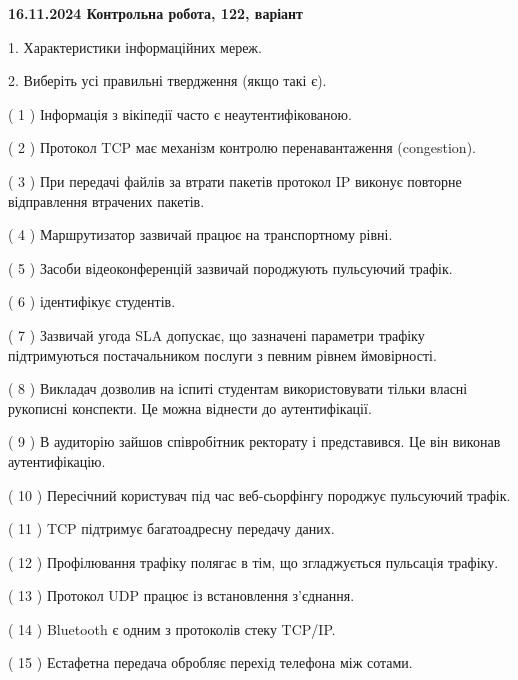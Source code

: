 \documentclass[12pt, ukrainian]{article}
\begin{document}
\vspace{4mm}
\newpage
\begin {large}

\textbf{16.11.2024 Контрольна робота, 122, варіант  }\par


{
1. Характеристики інформаційних мереж.



\vspace{5mm}
2. Виберіть усі правильні твердження (якщо такі є).\par
\vspace{2mm}

( 1 ) Інформація з вікіпедії часто є неаутентифікованою.

( 2 ) Протокол TCP має механізм контролю перенавантаження (congestion).

( 3 ) При передачі файлів за втрати пакетів протокол IP виконує повторне відправлення втрачених пакетів.

( 4 ) Маршрутизатор зазвичай працює на транспортному рівні.

( 5 ) Засоби відеоконференцій зазвичай породжують пульсуючий трафік.

( 6 ) ідентифікує студентів.

( 7 ) Зазвичай угода  SLA допускає, що зазначені параметри трафіку підтримуються постачальником послуги з певним рівнем ймовірності.

( 8 ) Викладач дозволив на іспиті студентам використовувати тільки власні рукописні конспекти. Це можна віднести до аутентифікації.

( 9 ) В аудиторію зайшов співробітник ректорату і представився. Це він виконав аутентифікацію.

( 10 ) Пересічний користувач під час веб-сьорфінгу породжує пульсуючий трафік.

( 11 ) TCP підтримує багатоадресну передачу даних.

( 12 ) Профілювання трафіку полягає в тім, що згладжується пульсація трафіку.

( 13 ) Протокол UDP працює із встановлення з'єднання.

( 14 ) Bluetooth є одним з протоколів стеку TCP/IP.

( 15 ) Естафетна передача обробляє перехід телефона між сотами.
}
\end {large}
\end{document}
